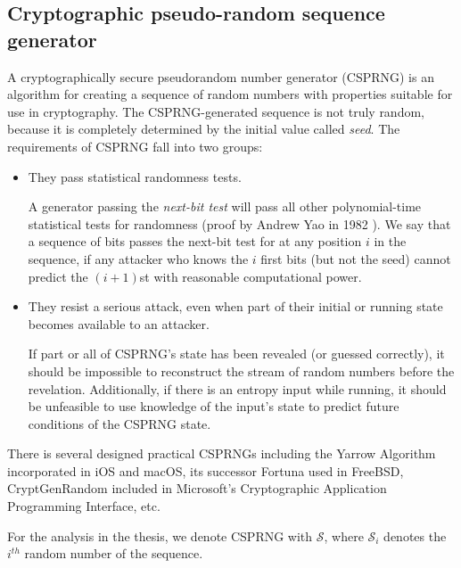 \subsection{Cryptographic pseudo-random sequence generator}
A cryptographically secure pseudorandom number generator (CSPRNG) is an algorithm for creating a sequence of random numbers with properties suitable for use in cryptography.
The CSPRNG-generated sequence is not truly random, because it is completely determined by the initial value called \textit{seed}. 
The requirements of CSPRNG fall into two groups: 
\begin{itemize}
    \item They pass statistical randomness tests. 
    
    A generator passing the \textit{next-bit test} will pass all other polynomial-time statistical tests for randomness (proof by Andrew Yao in 1982 \cite{yao1982theory}). We say that a sequence of bits passes the next-bit test for at any position $i$ in the sequence, if any attacker who knows the $i$ first bits (but not the seed) cannot predict the $(i+1)$st with reasonable computational power.
    
    \item They resist a serious attack, even when part of their initial or running state becomes available to an attacker.
    
    If part or all of CSPRNG's state has been revealed (or guessed correctly), it should be impossible to reconstruct the stream of random numbers before the revelation. Additionally, if there is an entropy input while running, it should be unfeasible to use knowledge of the input's state to predict future conditions of the CSPRNG state.
\end{itemize}

There is several designed practical CSPRNGs including the Yarrow Algorithm \cite{kelsey1999yarrow} incorporated in iOS and macOS, its successor Fortuna \cite{ferguson2015generating} used in FreeBSD, CryptGenRandom \cite{cryptgenrandom} included in Microsoft's Cryptographic Application Programming Interface, etc.

For the analysis in the thesis, we denote CSPRNG with $\mathcal{S}$, where $\mathcal{S}_i$ denotes the $i^{th}$ random number of the sequence.

